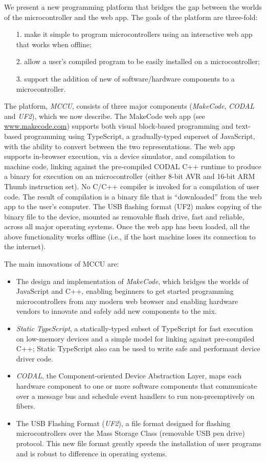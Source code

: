 We present a new programming platform that bridges the gap between the worlds of the microcontroller
and the web app. The goals of the platform are three-fold:
\begin{itemize}
\item[1.] make it simple to program microcontrollers using an interactive web app that works when offline;
\item[2.] allow a user's compiled program to be easily installed on a microcontroller;
\item[3.] support the addition of new of software/hardware components to a microcontroller.
\end{itemize}
The platform, \emph{MCCU}, consists of three major components (\emph{MakeCode}, \emph{CODAL} and \emph{UF2}), which we now describe. 
The MakeCode web app (see \url{www.makecode.com}) supports both visual block-based programming and text-based programming 
using TypeScript, a gradually-typed superset of JavaScript, with the ability to convert between the two representations. 
The web app supports in-browser execution, via a device simulator, and compilation to machine code, linking against the 
pre-compiled CODAL C++ runtime to produce a binary for execution on an microcontroller (either 8-bit AVR and 16-bit ARM 
Thumb instruction set). No C/C++ compiler is invoked for a compilation of user code. The result of compilation is a 
binary file that is ``downloaded'' from the web app to the user's computer. The USB flashing format (UF2) makes copying 
of the binary file to the device, mounted as removable flash drive, fast and reliable, across all major operating systems. 
Once the web app has been loaded, all the above functionality works offline (i.e., if the host machine loses its connection 
to the internet).

The main innovations of MCCU are:
\begin{itemize}
\item The design and implementation of \emph{MakeCode}, which bridges the worlds of JavaScript and C++, 
      enabling beginners to get started programming microcontrollers from any modern web browser and enabling 
      hardware vendors to innovate and safely add new components to the mix. 
\item \emph{Static TypeScript}, a statically-typed subset of TypeScript for fast execution on low-memory devices and a simple model for linking against pre-compiled C++; Static TypeScript also can be used to write safe and performant device driver code.
\item \emph{CODAL}, the Component-oriented Device Abstraction Layer, maps each hardware component to one or more software components that communicate over a message bus and schedule event handlers to run non-preemptively on fibers. 
\item The USB Flashing Format (\emph{UF2}), a file format designed for flashing microcontrollers over the Mass Storage Class (removable USB pen drive) protocol.  This new file format greatly speeds the installation of user programs and is robust to difference in operating systems.
\end{itemize}

